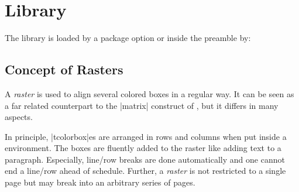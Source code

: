 \clearpage
\section{Library }\label{sec:raster}
The library is loaded by a package option or inside the preamble by:
\begin{dispListing}
\end{dispListing}


\subsection{Concept of Rasters}\label{subsec:raster_overview}

A \emph{raster} is used to align several colored boxes in a regular way.
It can be seen as a far related counterpart to the |matrix| construct
of \tikzname, but it differs in many aspects.

In principle, |tcolorbox|es are arranged in rows and columns when put
inside a  environment. The boxes are fluently added to the
raster like adding text to a paragraph.
Especially, line/row breaks are done
automatically and one cannot end a line/row ahead of schedule.
Further, a \emph{raster} is not restricted to a single page but may
break into an arbitrary series of pages.

